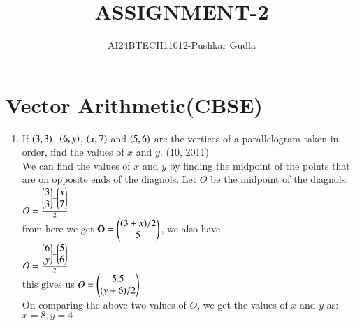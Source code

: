 \documentclass[journal,12pt,twocolumn]{IEEEtran}
\theoremstyle{remark}
\begin{document}

\vspace{3cm}

\title{ASSIGNMENT-2}
\author{AI24BTECH11012-Pushkar Gudla}
\maketitle
\newpage
\bigskip
\section*{\textbf{Vector Arithmetic(CBSE)}}
\begin{enumerate}
	\item If $\left(3,3\right)$, $\left(6,y\right)$, $\left(x,7\right)$ and $\left(5,6\right)$ are the vertices of a parallelogram taken in order, find the values of $x$ and $y$. 
		\hfill{(10, 2011)}\\

		\solution We can find the values of $x$ and $y$ by finding the midpoint of the points that are on opposite ends of the diagnols. Let $O$ be the midpoint of the diagnols.\\

		$O=\frac{\begin{pmatrix}3\\3\end{pmatrix}+\begin{pmatrix}x\\7\end{pmatrix}}{2}$\\
		from here we get $\mathbf{O}=\begin{pmatrix}(3+x)/2 \\ 5\end{pmatrix}$, we also have\\
		$O=\frac{\begin{pmatrix}6\\y\end{pmatrix}+\begin{pmatrix}5\\6\end{pmatrix}}{2}$\\
		this gives us $O=\begin{pmatrix}5.5\\(y+6)/2\end{pmatrix}$\\
		On comparing the above two values of $O$, we get the values of $x$ and $y$ as:\\
		$x=8, y=4$
	
		
\end{enumerate}
\end{document}
